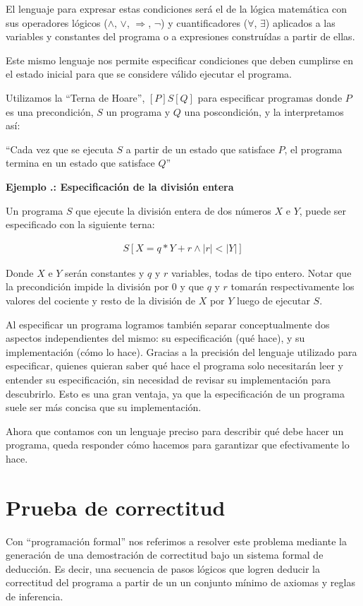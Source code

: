 \documentclass[12pt, a4paper, openany, fleqn]{book}
\newcounter{example}[chapter]
\renewcommand{\theexample}{\thechapter.\arabic{example}}
\newcommand{\example}[1]{
  \refstepcounter{example} %
  \vspace{1em}
  \noindent\textbf{Ejemplo \theexample: #1}
}
\newcommand{\hoare}[3]{\ensuremath{[#1]#2[#3]}}
\newcommand{\verticalHoare}[3]{
    \begin{align*}
        [#1]
        #2
        [#3]
    \end{align*}
}
\begin{document}
    El lenguaje para expresar estas condiciones será el de la lógica matemática con sus operadores lógicos ($\land$, $\lor$, $\Rightarrow$, $\neg$) y cuantificadores ($\forall$, $\exists$) aplicados a las variables y constantes del programa o a expresiones construídas a partir de ellas.

    Este mismo lenguaje nos permite especificar condiciones que deben cumplirse en el estado inicial para que se considere válido ejecutar el programa.

    Utilizamos la ``Terna de Hoare'', \hoare{P}{S}{Q} para especificar programas donde $P$ es una precondición, $S$ un programa y $Q$ una poscondición, y la interpretamos así:

    ``Cada vez que se ejecuta $S$ a partir de un estado que satisface $P$, el programa termina en un estado que satisface $Q$''

    \example{Especificación de la división entera}

    Un programa $S$ que ejecute la división entera de dos números $X$ e $Y$, puede ser especificado con la siguiente terna:
    \verticalHoare{Y \neq 0}{S}{X = q * Y + r \land |r| < |Y|}
    Donde $X$ e $Y$ serán constantes y $q$ y $r$ variables, todas de tipo entero.
    Notar que la precondición impide la división por $0$ y que $q$ y $r$ tomarán respectivamente los valores del cociente y resto de la división de $X$ por $Y$ luego de ejecutar $S$.

    \vspace{1em}

    Al especificar un programa logramos también separar conceptualmente dos aspectos independientes del mismo: su especificación (qué hace), y su implementación (cómo lo hace).
    Gracias a la precisión del lenguaje utilizado para especificar, quienes quieran saber qué hace el programa solo necesitarán leer y entender su especificación, sin necesidad de revisar su implementación para descubrirlo. Esto es una gran ventaja, ya que la especificación de un programa suele ser más concisa que su implementación.

    Ahora que contamos con un lenguaje preciso para describir qué debe hacer un programa, queda responder cómo hacemos para garantizar que efectivamente lo hace.

    \section{Prueba de correctitud}
    Con ``programación formal'' nos referimos a resolver este problema mediante la generación de una demostración de correctitud bajo un sistema formal de deducción. Es decir, una secuencia de pasos lógicos que logren deducir la correctitud del programa a partir de un un conjunto mínimo de axiomas y reglas de inferencia.
\end{document}

